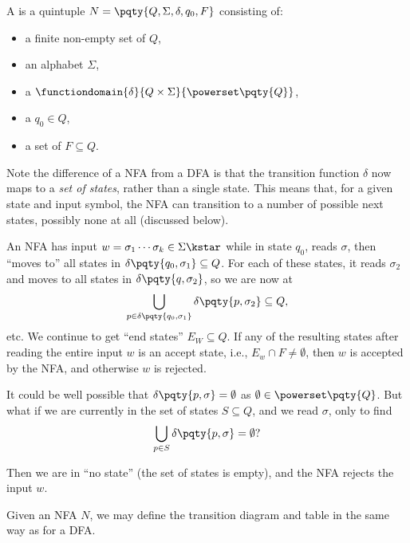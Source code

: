 \begin{definition}
    A  is a quintuple \(N = \pqty{Q, \Sigma, \delta, q_0, F}\) consisting of:
    \begin{itemize}
        \item a finite non-empty set of  \(Q\),
        \item an alphabet \(\Sigma\),
        \item a  \(\functiondomain{\delta}{Q \times \Sigma}{\powerset\pqty{Q}}\),
        \item a  \(q_0 \in Q\),
        \item a set of  \(F \subseteq Q\).
    \end{itemize}
\end{definition}

\begin{remark}
    Note the difference of a NFA from a DFA is that the transition function \(\delta\) now maps to a \emph{set of states}, rather than a single state. This means that, for a given state and input symbol, the NFA can transition to a number of possible next states, possibly none at all (discussed below).
\end{remark}

An NFA has input \(w = \sigma_1 \cdots \sigma_k \in \Sigma\kstar\) while in state \(q_0\), reads \(\sigma\), then ``moves to'' all states in \(\delta\pqty{q_0, \sigma_1} \subseteq Q\). For each of these states, it reads \(\sigma_2\) and moves to all states in \(\delta\pqty{q, \sigma_2}\), so we are now at
\[
    \bigcup_{p \in \delta\pqty{q_0, \sigma_1}} \delta\pqty{p, \sigma_2} \subseteq Q,
\]
etc. We continue to get ``end states'' \(E_W \subseteq Q\). If any of the resulting states after reading the entire input \(w\) is an accept state, i.e., \(E_w \cap F \neq \emptyset\), then \(w\) is accepted by the NFA, and otherwise \(w\) is rejected.

It could be well possible that \(\delta\pqty{p, \sigma} = \emptyset\) as \(\emptyset \in \powerset\pqty{Q}\). But what if we are currently in the set of states \(S \subseteq Q\), and we read \(\sigma\), only to find
\[
    \bigcup_{p \in S} \delta\pqty{p, \sigma} = \emptyset?
\]

Then we are in ``no state'' (the set of states is empty), and the NFA rejects the input \(w\).

Given an NFA \(N\), we may define the transition diagram and table in the same way as for a DFA.

